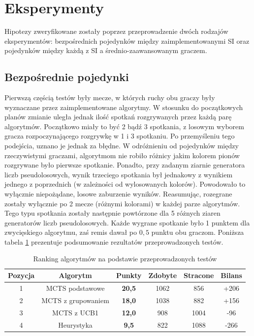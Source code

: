 \documentclass[10pt]{article}
\begin{document}
\section{Eksperymenty}
Hipotezy zweryfikowane zostały poprzez przeprowadzenie dwóch rodzajów eksperymentów: bezpośrednich pojedynków między zaimplementowanymi SI oraz pojedynków między każdą z SI a średnio-zaawansowanym graczem.

\subsection{Bezpośrednie pojedynki}
Pierwszą częścią testów były mecze, w których ruchy obu graczy były wyznaczane przez zaimplementowane algorytmy. W stosunku do początkowych planów zmianie uległa jednak ilość spotkań rozgrywanych przez każdą parę algorytmów. Początkowo miały to być 2 bądź 3 spotkania, z losowym wyborem gracza rozpoczynającego rozgrywkę w 1 i 3 spotkaniu. Po przemyśleniu tego podejścia, uznano je jednak za błędne. W odróżnieniu od pojedynków między rzeczywistymi graczami, algorytmom nie robiło różnicy jakim kolorem pionów rozgrywane było pierwsze spotkanie. Ponadto, przy zadanym ziarnie generatora liczb pseudolosowych, wynik trzeciego spotkania był jednakowy z wynikiem jednego z poprzednich (w zależności od wylosowanych kolorów). Powodowało to wyłącznie niepożądane, losowe zaburzenie wyników. Reasumując, rozegrane zostały wyłącznie po 2 mecze (różnymi kolorami) w każdej parze algorytmów. Tego typu spotkania zostały następnie powtórzone dla 5 różnych ziaren generatorów liczb pseudolosowych. Każde wygrane spotkanie  było 1 punktem dla zwycięskiego algorytmu, zaś remis dawał po $0,5$ punktu obu graczom. Poniższa tabela \ref{tab:test1a} prezentuje podsumowanie rezultatów przeprowadzonych testów.

\begin{table}[H]
\centering
\begin{tabularx}{0.7\textwidth}{c|c|c|c|c|c}
\hline
Pozycja & Algorytm & Punkty & Zdobyte & Stracone & Bilans \\
\hline \hline
1 & MCTS podstawowe & \textbf{20,5} & 1062 & 856 & +206 \\
2 & MCTS z grupowaniem & \textbf{18,0} & 1038 & 882 & +156 \\
3 & MCTS z UCB1 & \textbf{12,0} & 908 & 1004 & -96 \\
4 & Heurystyka & \textbf{9,5} & 822 & 1088 & -266 \\
\hline
\end{tabularx}
\caption{Ranking algorytmów na podstawie przeprowadzonych testów}
\label{tab:test1a}
\end{table}
\end{document}
